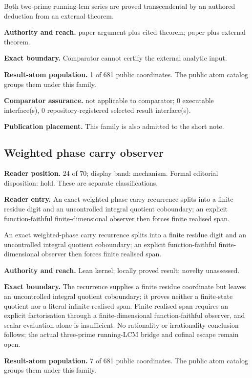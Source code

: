 \documentclass[11pt]{article}
\begin{document}
Both two-prime running-lcm series are proved transcendental by an authored deduction from an external theorem.

\textbf{Authority and reach.} paper argument plus cited theorem; paper plus external theorem.

\textbf{Exact boundary.} Comparator cannot certify the external analytic input.

\textbf{Result-atom population.} 1 of 681 public coordinates. The public atom catalog groups them under this family.

\textbf{Comparator assurance.} not applicable to comparator; 0 executable interface(s), 0 repository-registered selected result interface(s).

\textbf{Publication placement.} This family is also admitted to the short note.

\subsection{Weighted phase carry observer}
\textbf{Reader position.} 24 of 70; display band: mechanism.  Formal editorial disposition: hold.  These are separate classifications.

\textbf{Reader entry.} An exact weighted-phase carry recurrence splits into a finite residue digit and an uncontrolled integral quotient coboundary; an explicit function-faithful finite-dimensional observer then forces finite realised span.

An exact weighted-phase carry recurrence splits into a finite residue digit and an uncontrolled integral quotient coboundary; an explicit function-faithful finite-dimensional observer then forces finite realised span.

\textbf{Authority and reach.} Lean kernel; locally proved result; novelty unassessed.

\textbf{Exact boundary.} The recurrence supplies a finite residue coordinate but leaves an uncontrolled integral quotient coboundary; it proves neither a finite-state quotient nor a literal infinite realised span. Finite realised span requires an explicit factorisation through a finite-dimensional function-faithful observer, and scalar evaluation alone is insufficient. No rationality or irrationality conclusion follows; the actual three-prime running-LCM bridge and cofinal escape remain open.

\textbf{Result-atom population.} 7 of 681 public coordinates. The public atom catalog groups them under this family.
\end{document}
